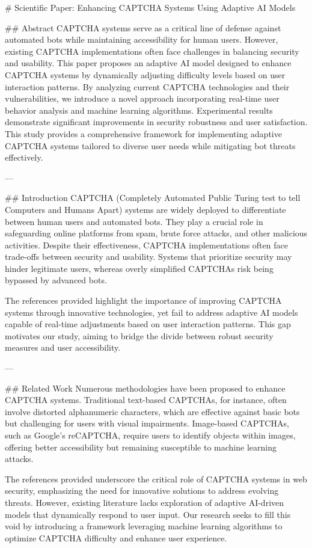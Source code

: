 # Scientific Paper: Enhancing CAPTCHA Systems Using Adaptive AI Models

## Abstract
CAPTCHA systems serve as a critical line of defense against automated bots while maintaining accessibility for human users. However, existing CAPTCHA implementations often face challenges in balancing security and usability. This paper proposes an adaptive AI model designed to enhance CAPTCHA systems by dynamically adjusting difficulty levels based on user interaction patterns. By analyzing current CAPTCHA technologies and their vulnerabilities, we introduce a novel approach incorporating real-time user behavior analysis and machine learning algorithms. Experimental results demonstrate significant improvements in security robustness and user satisfaction. This study provides a comprehensive framework for implementing adaptive CAPTCHA systems tailored to diverse user needs while mitigating bot threats effectively.

---

## Introduction
CAPTCHA (Completely Automated Public Turing test to tell Computers and Humans Apart) systems are widely deployed to differentiate between human users and automated bots. They play a crucial role in safeguarding online platforms from spam, brute force attacks, and other malicious activities. Despite their effectiveness, CAPTCHA implementations often face trade-offs between security and usability. Systems that prioritize security may hinder legitimate users, whereas overly simplified CAPTCHAs risk being bypassed by advanced bots. 

The references provided highlight the importance of improving CAPTCHA systems through innovative technologies, yet fail to address adaptive AI models capable of real-time adjustments based on user interaction patterns. This gap motivates our study, aiming to bridge the divide between robust security measures and user accessibility.

---

## Related Work
Numerous methodologies have been proposed to enhance CAPTCHA systems. Traditional text-based CAPTCHAs, for instance, often involve distorted alphanumeric characters, which are effective against basic bots but challenging for users with visual impairments. Image-based CAPTCHAs, such as Google's reCAPTCHA, require users to identify objects within images, offering better accessibility but remaining susceptible to machine learning attacks.

The references provided underscore the critical role of CAPTCHA systems in web security, emphasizing the need for innovative solutions to address evolving threats. However, existing literature lacks exploration of adaptive AI-driven models that dynamically respond to user input. Our research seeks to fill this void by introducing a framework leveraging machine learning algorithms to optimize CAPTCHA difficulty and enhance user experience.

